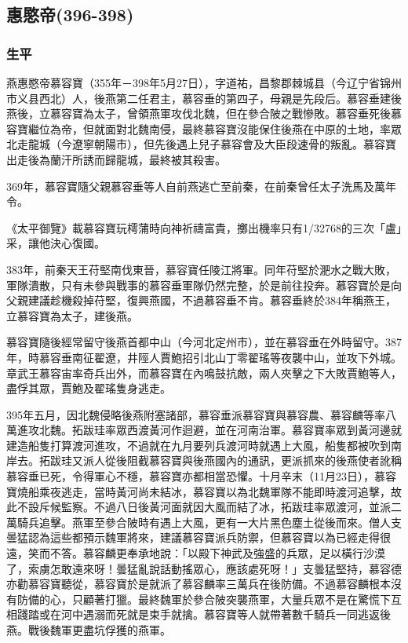 
\subsection{惠愍帝\tiny(396-398)}

\subsubsection{生平}

燕惠愍帝慕容寶（355年－398年5月27日），字道祐，昌黎郡棘城县（今辽宁省锦州市义县西北）人，後燕第二任君主，慕容垂的第四子，母親是先段后。慕容垂建後燕後，立慕容寶為太子，曾領燕軍攻伐北魏，但在參合陂之戰慘敗。慕容垂死後慕容寶繼位為帝，但就面對北魏南侵，最終慕容寶沒能保住後燕在中原的土地，率眾北走龍城（今遼寧朝陽市），但先後遇上兒子慕容會及大臣段速骨的叛亂。慕容寶出走後為蘭汗所誘而歸龍城，最終被其殺害。

369年，慕容寶隨父親慕容垂等人自前燕逃亡至前秦，在前秦曾任太子洗馬及萬年令。

《太平御覽》載慕容寶玩樗蒲時向神祈禱富貴，擲出機率只有1/32768的三次「盧」采，讓他決心復國。

383年，前秦天王苻堅南伐東晉，慕容寶任陵江將軍。同年苻堅於淝水之戰大敗，軍隊潰散，只有未參與戰事的慕容垂軍隊仍然完整，於是前往投奔。慕容寶於是向父親建議趁機殺掉苻堅，復興燕國，不過慕容垂不肯。慕容垂終於384年稱燕王，立慕容寶為太子，建後燕。

慕容寶隨後經常留守後燕首都中山（今河北定州市），並在慕容垂在外時留守。387年，時慕容垂南征翟遼，井陘人賈鮑招引北山丁零翟瑤等夜襲中山，並攻下外城。章武王慕容宙率奇兵出外，而慕容寶在內鳴鼓抗敵，兩人夾擊之下大敗賈鮑等人，盡俘其眾，賈鮑及翟瑤隻身逃走。

395年五月，因北魏侵略後燕附塞諸部，慕容垂派慕容寶與慕容農、慕容麟等率八萬進攻北魏。拓跋珪率眾西渡黃河作迴避，並在河南治軍。慕容寶率眾到黃河邊就建造船隻打算渡河進攻，不過就在九月要列兵渡河時就遇上大風，船隻都被吹到南岸去。拓跋珪又派人從後阻截慕容寶與後燕國內的通訊，更派抓來的後燕使者訛稱慕容垂已死，令得軍心不穩，慕容寶亦都相當恐懼。十月辛末（11月23日），慕容寶燒船乘夜逃走，當時黃河尚未結冰，慕容寶以為北魏軍隊不能即時渡河追擊，故此不設斥候監察。不過八日後黃河面就因大風而結了冰，拓跋珪率眾渡河，並派二萬騎兵追擊。燕軍至參合陂時有遇上大風，更有一大片黑色塵土從後而來。僧人支曇猛認為這些都預示魏軍將來，建議慕容寶派兵防禦，但慕容寶以為已經走得很遠，笑而不答。慕容麟更奉承地說：「以殿下神武及強盛的兵眾，足以橫行沙漠了，索虜怎敢遠來呀！曇猛亂說話動搖眾心，應該處死呀！」支曇猛堅持，慕容德亦勸慕容寶聽從，慕容寶於是就派了慕容麟率三萬兵在後防備。不過慕容麟根本沒有防備的心，只顧著打獵。最終魏軍於參合陂突襲燕軍，大量兵眾不是在驚慌下互相踐踏或在河中遇溺而死就是束手就擒。慕容寶等人就帶著數千騎兵一同逃返後燕。戰後魏軍更盡坑俘獲的燕軍。

